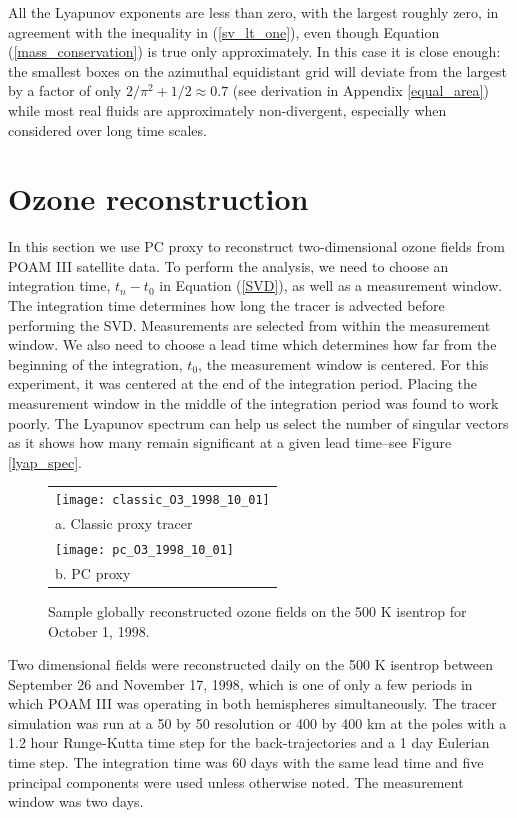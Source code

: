 All the Lyapunov exponents are less than zero, with the largest roughly zero, 
in agreement with the inequality in (\ref{sv_lt_one}),
even though Equation (\ref{mass_conservation}) is true only approximately.
In this case it is close enough: the smallest boxes on the
azimuthal equidistant grid will deviate from the largest by
a factor of only $2/\pi^2+1/2\approx0.7$ (see derivation in
Appendix \ref{equal_area})
while most real fluids are approximately non-divergent, especially
when considered over long time scales.

\section{Ozone reconstruction}

In this section we use PC proxy to reconstruct two-dimensional ozone fields 
from POAM III satellite data.
To perform the analysis, we need to choose an integration time, 
$t_n-t_0$ in Equation (\ref{SVD}), as well as a measurement window.
The integration time determines how long the tracer is advected 
before performing the SVD.
Measurements are selected from within the measurement window.
We also need to choose a lead time which determines how far from the
beginning of the integration, $t_0$, the measurement window is centered.
For this experiment, it was centered at the end of the integration period.
Placing the measurement window in the middle of the integration period
was found to work poorly.
The Lyapunov spectrum can help us select the number of singular vectors
as it shows how many remain significant at
a given lead time--see Figure \ref{lyap_spec}.

\begin{figure}
  \begin{tabular}{l}
    \texttt{[image: classic\_O3\_1998\_10\_01]} \\
    a. Classic proxy tracer \\
    \texttt{[image: pc\_O3\_1998\_10\_01]} \\
    b. PC proxy
  \end{tabular}
  \caption{Sample globally reconstructed ozone fields on the 500 K isentrop for October 1, 1998.}
  \label{sample_O3_field}
\end{figure}

Two dimensional fields were reconstructed daily on the 500 K isentrop
between September 26 and November 17, 1998,
which is one of only a few periods in which POAM III was operating in both 
hemispheres simultaneously.
The tracer simulation was run at a 50 by 50 resolution or 400 by 400 km at
the poles with a 1.2 hour Runge-Kutta time step for the back-trajectories
and a 1 day Eulerian time step.
The integration time was 60 days with the same lead time
and five principal components were used unless otherwise noted.
The measurement window was two days.

